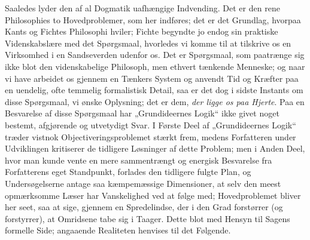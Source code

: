 \documentclass[12pt,a4paper]{book}
\newcommand{\opage}[1]{\marginnote{\footnotesize\textit{[#1]}}}
\begin{document}
Saaledes lyder den af al Dogmatik uafhængige
Indvending. Det er den rene Philosophies to Hovedproblemer,
som her indføres; det er det Grundlag,
hvorpaa Kants og Fichtes Philosophi hviler; Fichte begyndte
jo endog sin praktiske Videnskabslære med det
Spørgsmaal, hvorledes vi komme til at tilskrive os en
Virksomhed i en Sandseverden udenfor os. Det er
Spørgsmaal, som paatrænge sig ikke blot den videnskabelige
Philosoph, men ethvert tænkende Menneske; og
naar vi have arbeidet os gjennem en Tænkers System
og anvendt Tid og Kræfter paa en uendelig, ofte temmelig
formalistisk Detail, saa er det dog i sidste Instants
om disse Spørgsmaal, vi ønske Oplysning; det er
dem, \emph{der ligge os paa Hjerte}. Paa en Besvarelse
af disse Spørgsmaal har „Grundideernes Logik“ ikke
givet noget bestemt, afgjørende og utvetydigt Svar. I
Første Deel af „Grundideernes Logik“ træder vistnok
Objectiveringsproblemet stærkt frem, medens Forfatteren
under Udviklingen kritiserer de tidligere Løsninger af
dette Problem; men i Anden Deel, hvor man kunde
vente en mere sammentrængt og energisk Besvarelse fra
Forfatterens eget Standpunkt, forlades den tidligere
fulgte Plan, og Undersøgelserne antage saa kæmpemæssige
Dimensioner, at selv den meest opmærksomme Læser har
\opage{52}\setcounter{footnote}{0}%
Vanskelighed ved at følge med; Hovedproblemet bliver
her seet, saa at sige, gjennem en Spredelindse, der i den
Grad forstørrer (og forstyrrer), at Omridsene tabe
sig i Taager. Dette blot med Hensyn til Sagens
formelle Side; angaaende Realiteten henvises til det
Følgende.
\end{document}
